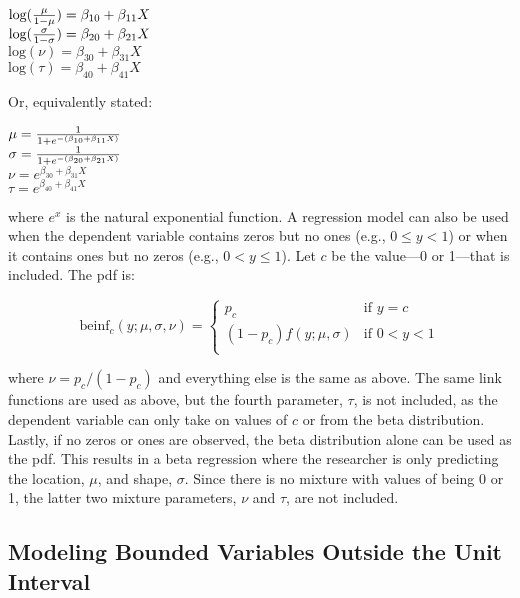 \documentclass[english,man]{apa6}
\theoremstyle{definition}
\theoremstyle{definition}
\theoremstyle{remark}
\begin{document}
\begin{center}
$\text{log}({\mu \over 1 - \mu}) = \beta_{10} + \beta_{11}X$\\
$\text{log}({\sigma \over 1 - \sigma}) = \beta_{20} + \beta_{21}X$\\
$\text{log}(\nu) = \beta_{30} + \beta_{31}X$\\
$\text{log}(\tau) = \beta_{40} + \beta_{41}X$
\end{center}

Or, equivalently stated:

\begin{center}
$\mu={1\over1+e^{-(\beta_{10}+\beta_{11}X)}}$\\
$\sigma={1\over1+e^{-(\beta_{20}+\beta_{21}X)}}$\\
$\nu = e^{\beta_{30} + \beta_{31}X}$\\
$\tau = e^{\beta_{40} + \beta_{41}X}$
\end{center}

where \(e^x\) is the natural exponential function. A regression model
can also be used when the dependent variable contains zeros but no ones
(e.g., \(0 \leq y < 1\)) or when it contains ones but no zeros (e.g.,
\(0 < y \leq 1\)). Let \(c\) be the value---0 or 1---that is included.
The pdf is:

\begin{center}
\[
\text{beinf}_c(y;\mu,\sigma,\nu) =
\begin{cases}
  p_c                             & \text{if } y = c\\
  (1 - p_c)f(y;\mu,\sigma)        & \text{if } 0 < y < 1\\
\end{cases}
\]
\end{center}

where \(\nu = p_c / (1 - p_c)\) and everything else is the same as
above. The same link functions are used as above, but the fourth
parameter, \(\tau\), is not included, as the dependent variable can only
take on values of \(c\) or from the beta distribution. Lastly, if no
zeros or ones are observed, the beta distribution alone can be used as
the pdf. This results in a beta regression where the researcher is only
predicting the location, \(\mu\), and shape, \(\sigma\). Since there is
no mixture with values of being 0 or 1, the latter two mixture
parameters, \(\nu\) and \(\tau\), are not included.

\subsection{Modeling Bounded Variables Outside the Unit
Interval}\label{modeling-bounded-variables-outside-the-unit-interval}
\end{document}

